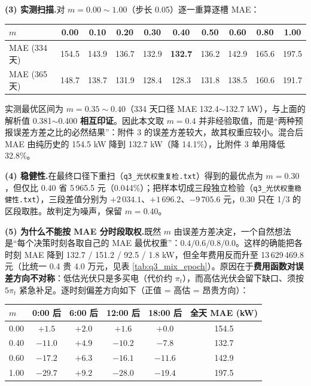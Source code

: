 \documentclass{cumcmthesis}
\begin{document}
\noindent\textbf{(3) 实测扫描.}对 $m=0.00\sim1.00$（步长 0.05）逐一重算逐槽 MAE：

\begin{center}
\small
\begin{tabular}{lccccccccc}
\hline
$m$ & 0.00 & 0.10 & 0.20 & 0.30 & \textbf{0.40} & 0.50 & 0.60 & 0.80 & 1.00 \\
\hline
MAE (334 天) & 154.5 & 143.9 & 136.7 & 132.9 & \textbf{132.7} & 136.2 & 142.9 & 165.6 & 197.5 \\
MAE (365 天) & 148.7 & 138.7 & 131.9 & 128.4 & 128.3 & 131.8 & 138.5 & 160.6 & 191.7 \\
\hline
\end{tabular}
\end{center}

实测最优区间为 $m=0.35\sim0.40$（334 天口径 MAE 132.4$\sim$132.7 kW），与上面的解析值 0.381$\sim$0.400 \textbf{相互印证}。因此本文取 $m=0.4$ 并非经验取值，而是“两种预报误差方差之比的必然结果”：附件 3 的误差方差较大，故其权重应较小。混合后 MAE 由纯历史的 154.5 kW 降到 132.7 kW（降 14.1\%），比附件 3 单用降低 32.8\%。

\noindent\textbf{(4) 稳健性.}在最终口径下重扫（\texttt{q3\_光伏权重复检.txt}）得到的最优点为 $m=0.30$，但仅比 0.40 省 5\,965.5 元（0.044\%）；把样本切成三段独立检验（\texttt{q3\_光伏权重稳健性.txt}），三段差值分别为 $+2\,034.1$、$+1\,696.2$、$-9\,705.6$ 元，0.30 只在 1/3 的区段取胜。故判定为噪声，保留 $m=0.40$。

\noindent\textbf{(5) 为什么不能按 MAE 分时段取权.}既然 $m$ 由误差方差决定，一个自然想法是“每个决策时刻各取自己的 MAE 最优权重”：$0.4/0.6/0.8/0.0$。这样的确能把各时刻 MAE 降到 132.7 / 151.2 / 92.5 / 1.8 kW，但全年费用反而升至 13\,629\,469.8 元（比统一 0.4 贵 4.0 万元，见表 \ref{tab:q3_mix_epoch}）。原因在于\textbf{费用函数对误差方向不对称}：低估光伏只是多买电（代价约 $\pi_t$），而高估光伏会留下缺口、须按 $5\pi_t$ 紧急补足。逐时刻偏差方向如下（正值 = 高估 = 昂贵方向）：

\begin{center}
\small
\begin{tabular}{lccccc}
\hline
$m$ & 0:00 后 & 6:00 后 & 12:00 后 & 18:00 后 & 全天 MAE (kW) \\
\hline
0.00 & $+1.5$ & $+2.0$ & $+1.6$ & $+0.0$ & 154.5 \\
0.40 & $-11.0$ & $+4.9$ & $-10.2$ & $-7.8$ & 132.7 \\
0.60 & $-17.2$ & $+6.3$ & $-16.1$ & $-11.6$ & 142.9 \\
1.00 & $-29.7$ & $+9.2$ & $-28.0$ & $-19.4$ & 197.5 \\
\hline
\end{tabular}
\end{center}
\end{document}
